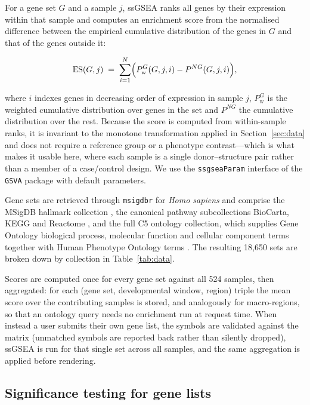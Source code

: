 \documentclass[pdflatex,sn-basic]{sn-jnl}
\begin{document}
For a gene set $G$ and a sample $j$, ssGSEA \citep{Barbie2009} ranks all genes
by their expression within that sample and computes an enrichment score from
the normalised difference between the empirical cumulative distribution of the
genes in $G$ and that of the genes outside it:

\begin{equation}\label{eq:ssgsea}
\mathrm{ES}(G, j) \;=\;
\sum_{i=1}^{N}\Bigl( P^{G}_{\mathrm{w}}(G, j, i) - P^{NG}(G, j, i) \Bigr),
\end{equation}

where $i$ indexes genes in decreasing order of expression in sample $j$,
$P^{G}_{\mathrm{w}}$ is the weighted cumulative distribution over genes in the
set and $P^{NG}$ the cumulative distribution over the rest. Because the score is
computed from within-sample ranks, it is invariant to the monotone
transformation applied in Section~\ref{sec:data} and does not require a
reference group or a phenotype contrast---which is what makes it usable here,
where each sample is a single donor--structure pair rather than a member of a
case/control design. We use the \texttt{ssgseaParam} interface of the
\texttt{GSVA} package \citep{Hanzelmann2013} with default parameters.

Gene sets are retrieved through \texttt{msigdbr} \citep{Dolgalev2026msigdbr} for
\emph{Homo sapiens} and comprise the MSigDB hallmark collection
\citep{Liberzon2015}, the canonical pathway subcollections BioCarta, KEGG
\citep{Kanehisa2000} and Reactome \citep{Gillespie2022}, and the full C5
ontology collection, which supplies Gene Ontology biological process, molecular
function and cellular component terms \citep{Ashburner2000,GOConsortium2023}
together with Human Phenotype Ontology terms \citep{Kohler2021}. The resulting
18{,}650 sets are broken down by collection in Table~\ref{tab:data}.

Scores are computed once for every gene set against all 524 samples, then
aggregated: for each (gene set, developmental window, region) triple the mean
score over the contributing samples is stored, and analogously for macro-regions,
so that an ontology query needs no enrichment run at request time. When instead a user submits their own gene list, the symbols are validated
against the matrix (unmatched symbols are reported back rather than silently
dropped), ssGSEA is run for that single set across all samples, and the same
aggregation is applied before rendering.

\subsection{Significance testing for gene lists}\label{sec:tests}
\end{document}
